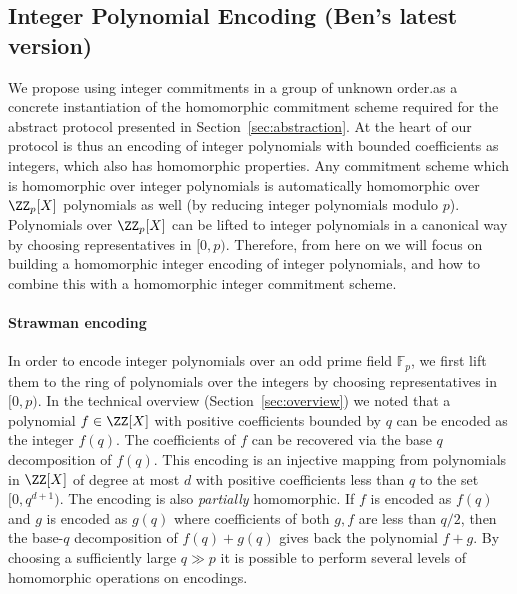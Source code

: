 \subsection{Integer Polynomial Encoding (Ben's latest version)}
\label{sec:encoding}
We propose using integer commitments in a group of unknown order.as a concrete instantiation of the homomorphic commitment scheme required for the abstract protocol presented in Section~\ref{sec:abstraction}. At the heart of our protocol is thus an encoding of integer polynomials with bounded coefficients as integers, which also has homomorphic properties. Any commitment scheme which is homomorphic over integer polynomials is automatically homomorphic over $\ZZ_p[X]$ polynomials as well (by reducing integer polynomials modulo $p$). Polynomials over $\ZZ_p[X]$ can be lifted to integer polynomials in a canonical way by choosing representatives in $[0,p)$. Therefore, from here on we will focus on building a homomorphic integer encoding of integer polynomials, and how to combine this with a homomorphic integer commitment scheme. 

\paragraph{Strawman encoding} In order to encode integer polynomials over an odd prime field $\mathbb{F}_p$, we first lift them to the ring of polynomials over the integers by choosing representatives in $[0,p)$. In the technical overview (Section~\ref{sec:overview}) we noted that a polynomial $f \in \ZZ[X]$ with positive coefficients bounded by $q$ can be encoded as the integer $f(q)$.   
The coefficients of $f$ can be recovered via the base $q$ decomposition of $f(q)$. %
This encoding is an injective mapping from polynomials in $\ZZ[X]$ of degree at most $d$ with positive coefficients less than $q$ to the set $[0, q^{d+1})$. The encoding is also \emph{partially} homomorphic. 
If $f$ is encoded as $f(q)$ and $g$ is encoded as $g(q)$ where coefficients of both $g, f$ are less than $q/2$, then the base-$q$ decomposition of $f(q) + g(q)$ gives back the polynomial $f + g$. 
By choosing a sufficiently large $q \gg p$ it is possible to perform several levels of homomorphic operations on encodings. 

